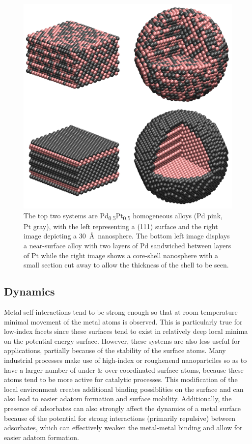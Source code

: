 \begin{figure}[p!]
  \includegraphics[width=\linewidth]{../figures/chap1/bimetallic.pdf}
\caption{The top two systems are Pd\textsubscript{0.5}Pt\textsubscript{0.5}
homogeneous alloys (Pd pink, Pt gray), with the left representing a (111) surface
and the right image depicting a 30~\AA\ nanosphere. The bottom left image
displays a near-surface alloy with two layers of Pd sandwiched between layers of
Pt while the right image shows a core-shell nanosphere with a small section cut
away to allow the thickness of the shell to be seen.}
\label{fig:bimetallic} 
\end{figure}

\subsection{Dynamics}
Metal self-interactions tend to be strong enough so that at room temperature
minimal movement of the metal atoms is observed. This is particularly true for
low-index facets since these surfaces tend to exist in relatively deep local
minima on the potential energy surface. However, these systems are also less
useful for applications, partially because of the stability of the surface
atoms. Many industrial processes make use of high-index or roughenend
nanopartciles so as to have a larger number of under \& over-coordinated
surface atoms, because these atoms tend to be more active for catalytic
processes.\citep{Calle-Vallejo:2015qq, Stephens:2011bv} This modification of
the local environment creates additional binding possiblities on the surface
and can also lead to easier adatom formation and surface mobility.
Additionally, the presence of adsorbates can also strongly affect the dynamics
of a metal surface because of the potential for strong interactions (primarily
repulsive) between adsorbates, which can effectively weaken the metal-metal
binding and allow for easier adatom formation.


